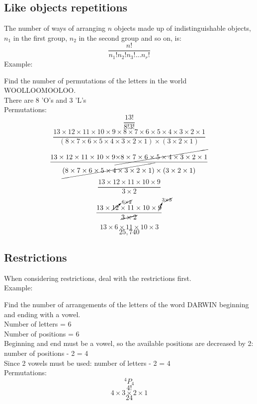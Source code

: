 \documentclass[a4paper,10pt]{report}
\begin{document}
		\subsection{Like objects repetitions}
			The number of ways of arranging $n$ objects made up of indistinguishable objects, $n_1$ in the first group, $n_2$ in the second group and so on, is:
			$$
				\frac{n!}{n_1! n_2! n_3!... n_r!}
			$$
			Example:\\
			\begin{center}
				Find the number of permutations of the letters in the world WOOLLOOMOOLOO.\\
				There are 8 'O's and 3 'L's\\
				Permutations:
				$$\frac{13!}{8!3!}$$
				$$\frac{13 \times 12 \times 11 \times 10 \times 9 \times 8 \times 7 \times 6 \times 5 \times 4 \times 3 \times 2 \times 1}{(8 \times 7 \times 6 \times 5 \times 4 \times 3 \times 2 \times 1) \times (3 \times 2 \times 1)}$$
				$$\frac{13 \times 12 \times 11 \times 10 \times 9 \cancel{\times 8 \times 7 \times 6 \times 5 \times 4 \times 3 \times 2 \times 1}}{\cancel{(8 \times 7 \times 6 \times 5 \times 4 \times 3 \times 2 \times 1)} \times (3 \times 2 \times 1)}$$
				$$\frac{13 \times 12 \times 11 \times 10 \times 9}{3 \times 2}$$
				$$\frac{13 \times \cancelto{6 \cancel{\times 2}}{12} \times 11 \times 10 \times \cancelto{3 \cancel{\times 3}}{9}}{\cancel{3 \times 2}}$$
				$$13 \times 6 \times 11 \times 10 \times 3$$
				$$25,740$$
			\end{center}

		\subsection{Restrictions}
			When considering restrictions, deal with the restrictions first.\\
			Example:\\
			\begin{center}
				Find the number of arrangements of the letters of the word DARWIN beginning and ending with a vowel.\\
				Number of letters = 6\\
				Number of positions = 6\\
				Beginning and end must be a vowel, so the available positions are decreased by 2: number of positions - 2 = 4\\
				Since 2 vowels must be used:  number of letters - 2 = 4\\
				Permutations:
				$$^4P_4$$
				$$4!$$
				$$4 \times 3 \times 2 \times 1$$
				$$24$$
			\end{center}
\end{document}
